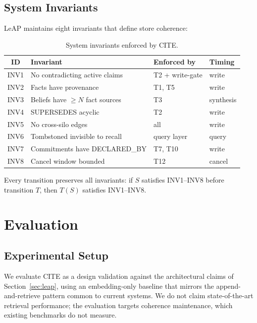 \documentclass[11pt,letterpaper]{article}
\begin{document}
\subsection{System Invariants}

LeAP maintains eight invariants that define store coherence:

\begin{table}[H]
\centering
\caption{System invariants enforced by CITE.}
\label{tab:invariants}
\begin{tabular}{@{}clll@{}}
\toprule
\textbf{ID} & \textbf{Invariant} & \textbf{Enforced by} & \textbf{Timing} \\
\midrule
INV1 & No contradicting active claims & T2 + write-gate & write \\
INV2 & Facts have provenance & T1, T5 & write \\
INV3 & Beliefs have $\geq N$ fact sources & T3 & synthesis \\
INV4 & SUPERSEDES acyclic & T2 & write \\
INV5 & No cross-silo edges & all & write \\
INV6 & Tombstoned invisible to recall & query layer & query \\
INV7 & Commitments have DECLARED\_BY & T7, T10 & write \\
INV8 & Cancel window bounded & T12 & cancel \\
\bottomrule
\end{tabular}
\end{table}

Every transition preserves all invariants: if $S$ satisfies INV1--INV8 before transition $T$, then $T(S)$ satisfies INV1--INV8.

\section{Evaluation}
\label{sec:eval}

\subsection{Experimental Setup}

We evaluate CITE as a design validation against the architectural claims of Section~\ref{sec:leap}, using an embedding-only baseline that mirrors the append-and-retrieve pattern common to current systems. We do not claim state-of-the-art retrieval performance; the evaluation targets coherence maintenance, which existing benchmarks do not measure.
\end{document}
